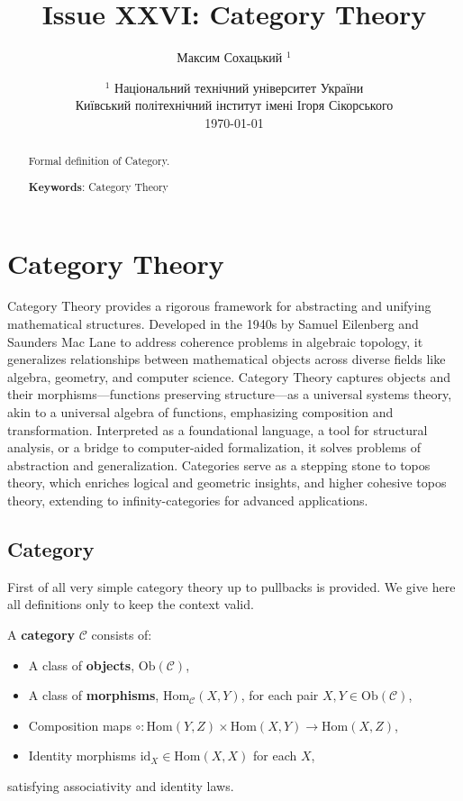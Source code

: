 \documentclass{article}
\begin{document}
\title{Issue XXVI: Category Theory}
\author{Максим Сохацький $^1$}
\date{ $^1$ Національний технічний університет України \\
       \small Київський політехнічний інститут імені Ігоря Сікорського \\
       \today }
\maketitle

\begin{abstract}

Formal definition of Category.

{\bf Keywords}: Category Theory \\
\end{abstract}

\ifincludeTOC
  \tableofcontents
\fi

\section{Category Theory}

Category Theory provides a rigorous framework for abstracting and unifying mathematical structures.
Developed in the 1940s by Samuel Eilenberg and Saunders Mac Lane to address coherence problems in
algebraic topology, it generalizes relationships between mathematical objects across diverse fields
like algebra, geometry, and computer science. Category Theory captures objects and their
morphisms—functions preserving structure—as a universal systems theory,
akin to a universal algebra of functions, emphasizing composition and transformation.
Interpreted as a foundational language, a tool for structural analysis,
or a bridge to computer-aided formalization, it solves problems of abstraction and generalization.
Categories serve as a stepping stone to topos theory, which enriches logical and geometric insights,
and higher cohesive topos theory, extending to infinity-categories for advanced applications.


\newpage
\subsection{Category}

First of all very simple category theory up to pullbacks is provided. We give here
all definitions only to keep the context valid.

A \textbf{category} $\mathcal{C}$ consists of:
\begin{itemize}
  \item A class of \textbf{objects}, $\mathrm{Ob}(\mathcal{C})$,
  \item A class of \textbf{morphisms}, $\mathrm{Hom}_{\mathcal{C}}(X,Y)$, for each pair $X,Y \in \mathrm{Ob}(\mathcal{C})$,
  \item Composition maps $\circ: \mathrm{Hom}(Y,Z) \times \mathrm{Hom}(X,Y) \to \mathrm{Hom}(X,Z)$,
  \item Identity morphisms $\mathrm{id}_X \in \mathrm{Hom}(X,X)$ for each $X$,
\end{itemize}
satisfying associativity and identity laws.
\end{document}
